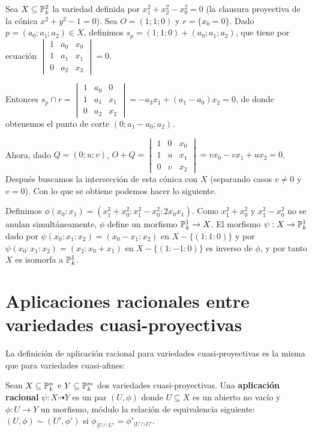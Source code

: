 \documentclass[ACGA.tex]{subfiles}
\begin{document}
\begin{ejs}
 Sea $X\subseteq\mathbb{P}^2_k$ la variedad definida por $x_1^2+x_2^2-x_0^2=0$ (la clausura proyectiva de la cónica $x^2+y^2-1=0$). Sea $O=(1;1;0)$ y $r=\{x_0=0\}$. Dado $p=(a_0;a_1;a_2)\in X$, definimos $s_p=(1;1;0)+(a_0 ;a_1;a_2)$, que tiene por ecuación $\begin{vmatrix}
 1 & a_0 & x_0\\
 1 & a_1 & x_1\\
 0 & a_2 & x_2
 \end{vmatrix}=0$. 
 
 Entonces $s_p\cap r=\begin{vmatrix}
 1 & a_0 & 0\\
 1 & a_1 & x_1\\
 0 & a_2 & x_2
 \end{vmatrix}=-a_3x_1+(a_1-a_0)x_2=0$, de donde obtenemos el punto de corte $(0;a_1-a_0;a_2)$. 
 
 Ahora, dado $Q=(0;u;v)$, $O+Q=\begin{vmatrix}
 1 & 0 & x_0\\
 1 & u & x_1\\
 0 & v & x_2
 \end{vmatrix}=vx_0-vx_1+ux_2=0$. Después buscamos la intersección de esta cónica con $X$ (separando casos $v\neq 0$ y $v=0$). Con lo que se obtiene podemos hacer lo siguiente. 

 Definimos $\phi(x_0:x_1)=(x_1^2+x_0^2:x_1^2-x_0^2:2x_0x_1)$.
 Como $x_1^2+x_0^2$ y $x_1^2-x_0^2$ no se anulan simultáneamente, $\phi$ define un morfismo $\mathbb{P}^1_k\to X$. El morfismo $\psi:X\to\mathbb{P}^1_k$ dado por $\psi(x_0:x_1:x_2)=(x_0-x_1:x_2)$ en $X-\{(1:1:0)\}$ y por $\psi(x_0:x_1:x_2)=(x_2:x_0+x_1)$ en $X-\{(1:-1:0)\}$ es inverso de $\phi$, y por tanto $X$ es isomorfa a $\mathbb{P}^1_k$.
\end{ejs}

\section{Aplicaciones racionales entre variedades cuasi-proyectivas}

La definición de aplicación racional para variedades cuasi-proyectivas es la misma que para variedades cuasi-afines:

\begin{defi}
 Sean $X\subseteq\mathbb{P}^n_k$ e $Y\subseteq\mathbb{P}^m_k$ dos variedades cuasi-proyectivas. Una {\bf aplicación racional} $\psi:X\dashrightarrow Y$ es un par $(U,\phi)$ donde $U\subseteq X$ es un abierto no vacío y $\phi:U\to Y$ un morfismo, módulo la relación de equivalencia siguiente: $(U,\phi)\sim(U',\phi')$ si $\phi_{|U\cap U'}=\phi'_{|U\cap U'}$.
\end{defi}
\end{document}
